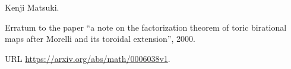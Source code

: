 Kenji Matsuki.

\newblock Erratum to the paper ``a note on the factorization theorem of toric
  birational maps after {Morelli} and its toroidal extension'', 2000.

\newblock URL \url{https://arxiv.org/abs/math/0006038v1}.

